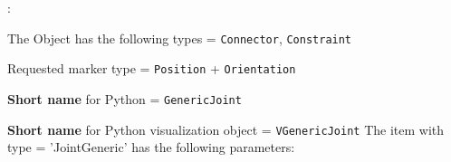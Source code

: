 \noindent {}:
\bi
  \item The Object has the following types = \texttt{Connector}, \texttt{Constraint}
  \item Requested marker type = \texttt{Position} + \texttt{Orientation}
  \item {\bf Short name} for Python = \texttt{GenericJoint}
  \item {\bf Short name} for Python visualization object = \texttt{VGenericJoint}
\ei\vspace{12pt} \noindent 
The item  with type = 'JointGeneric' has the following parameters:
\vspace{-0.5cm}\\
\vspace{-0.5cm}\\
